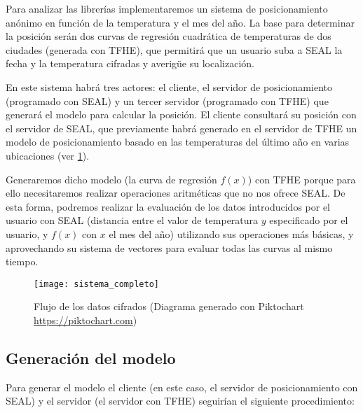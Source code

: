 Para analizar las librerías implementaremos un sistema de posicionamiento anónimo en función de la temperatura y el mes del año. La base para determinar la posición serán dos curvas de regresión cuadrática de temperaturas de dos ciudades (generada con TFHE), que permitirá que un usuario suba a SEAL la fecha y la temperatura cifradas y averigüe su localización.

En este sistema habrá tres actores: el cliente, el servidor de posicionamiento (programado con SEAL) y un tercer servidor (programado con TFHE) que generará el modelo para calcular la posición. El cliente consultará su posición con el servidor de SEAL, que previamente habrá generado en el servidor de TFHE un modelo de posicionamiento basado en las temperaturas del último año en varias ubicaciones (ver \ref{fig:sistema_completo}).

Generaremos dicho modelo (la curva de regresión $f(x)$) con TFHE porque para ello necesitaremos realizar operaciones aritméticas que no nos ofrece SEAL. De esta forma, podremos realizar la evaluación de los datos introducidos por el usuario con SEAL (distancia entre el valor de temperatura $y$ especificado por el usuario, y $f(x)$ con $x$ el mes del año) utilizando sus operaciones más básicas, y aprovechando su sistema de vectores para evaluar todas las curvas al mismo tiempo.

\begin{figure}[h]
    \centering
    \texttt{[image: sistema\_completo]}
    \caption{Flujo de los datos cifrados (Diagrama generado con Piktochart \url{https://piktochart.com})}
    \label{fig:sistema_completo}
\end{figure}

\subsection{Generación del modelo}

Para generar el modelo el cliente (en este caso, el servidor de posicionamiento con SEAL) y el servidor (el servidor con TFHE) seguirían el siguiente procedimiento:

